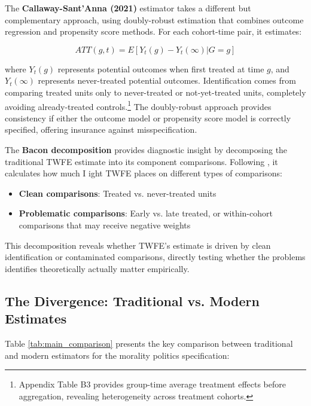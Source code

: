 \documentclass[12pt,letterpaper,oneside]{book}
\begin{document}
The \textbf{Callaway-Sant'Anna (2021)} estimator takes a different but complementary approach, using doubly-robust estimation that combines outcome regression and propensity score methods. For each cohort-time pair, it estimates:

$$ ATT(g,t) = E[Y_t(g) - Y_t(\infty) | G = g] $$

where $Y_t(g)$ represents potential outcomes when first treated at time $g$, and $Y_t(\infty)$ represents never-treated potential outcomes. Identification comes from comparing treated units only to never-treated or not-yet-treated units, completely avoiding already-treated controls.\footnote{Appendix Table B3 provides group-time average treatment effects before aggregation, revealing heterogeneity across treatment cohorts.} The doubly-robust approach provides consistency if either the outcome model or propensity score model is correctly specified, offering insurance against misspecification.

The \textbf{Bacon decomposition} provides diagnostic insight by decomposing the traditional TWFE estimate into its component comparisons. Following \citet{bacon2021difference}, it calculates how much I ight TWFE places on different types of comparisons:

\begin{itemize}
    \item \textbf{Clean comparisons}: Treated vs. never-treated units
    \item \textbf{Problematic comparisons}: Early vs. late treated, or within-cohort comparisons that may receive negative weights
\end{itemize}

This decomposition reveals whether TWFE's estimate is driven by clean identification or contaminated comparisons, directly testing whether the problems \citet{de2020two} identifies theoretically actually matter empirically.

\subsection{The Divergence: Traditional vs. Modern Estimates}

Table \ref{tab:main_comparison} presents the key comparison between traditional and modern estimators for the morality politics specification:
\end{document}
